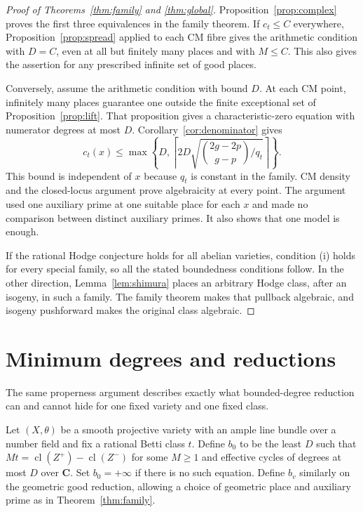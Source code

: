 \documentclass[11pt]{article}
\theoremstyle{definition}
\theoremstyle{remark}
\newcommand{\C}{\mathbf C}
\newcommand{\cl}{\operatorname{cl}}
\begin{document}
\begin{proof}[Proof of Theorems~\ref{thm:family} and \ref{thm:global}]
Proposition~\ref{prop:complex} proves the first three equivalences in the family theorem. If $c_t\leq C$ everywhere, Proposition~\ref{prop:spread} applied to each CM fibre gives the arithmetic condition with $D=C$, even at all but finitely many places and with $M\leq C$. This also gives the assertion for any prescribed infinite set of good places.

Conversely, assume the arithmetic condition with bound $D$. At each CM point, infinitely many places guarantee one outside the finite exceptional set of Proposition~\ref{prop:lift}. That proposition gives a characteristic-zero equation with numerator degrees at most $D$. Corollary~\ref{cor:denominator} gives
\[
 c_t(x)\leq
 \max\left\{D,\left\lceil 2D\sqrt{\binom{2g-2p}{g-p}/q_t}\right\rceil\right\}.
\]
This bound is independent of $x$ because $q_t$ is constant in the family. CM density and the closed-locus argument prove algebraicity at every point. The argument used one auxiliary prime at one suitable place for each $x$ and made no comparison between distinct auxiliary primes. It also shows that one model is enough.

If the rational Hodge conjecture holds for all abelian varieties, condition (i) holds for every special family, so all the stated boundedness conditions follow. In the other direction, Lemma~\ref{lem:shimura} places an arbitrary Hodge class, after an isogeny, in such a family. The family theorem makes that pullback algebraic, and isogeny pushforward makes the original class algebraic.
\end{proof}

\section{Minimum degrees and reductions}
\label{sec:ghosts}

The same properness argument describes exactly what bounded-degree reduction can and cannot hide for one fixed variety and one fixed class.

Let $(X,\theta)$ be a smooth projective variety with an ample line bundle over a number field and fix a rational Betti class $t$. Define $b_0$ to be the least $D$ such that $Mt=\cl(Z^+)-\cl(Z^-)$ for some $M\geq1$ and effective cycles of degrees at most $D$ over $\C$. Set $b_0=+\infty$ if there is no such equation. Define $b_v$ similarly on the geometric good reduction, allowing a choice of geometric place and auxiliary prime as in Theorem~\ref{thm:family}.
\end{document}
